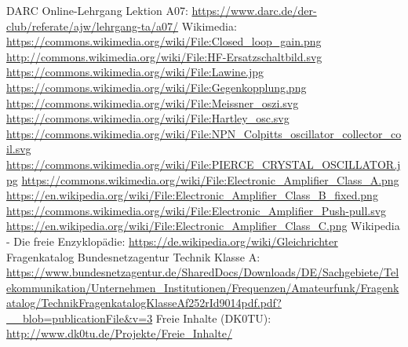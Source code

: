 \begin{thebibliography}{}
      DARC Online-Lehrgang Lektion A07:
                    \url{https://www.darc.de/der-club/referate/ajw/lehrgang-ta/a07/}
     	Wikimedia:
                    \url{https://commons.wikimedia.org/wiki/File:Closed_loop_gain.png}
                    \url{http://commons.wikimedia.org/wiki/File:HF-Ersatzschaltbild.svg}
                    \url{https://commons.wikimedia.org/wiki/File:Lawine.jpg}
                    \url{https://commons.wikimedia.org/wiki/File:Gegenkopplung.png}
                    \url{https://commons.wikimedia.org/wiki/File:Meissner_oszi.svg}
                    \url{https://commons.wikimedia.org/wiki/File:Hartley_osc.svg}
                    \url{https://commons.wikimedia.org/wiki/File:NPN_Colpitts_oscillator_collector_coil.svg}
                    \url{https://commons.wikimedia.org/wiki/File:PIERCE_CRYSTAL_OSCILLATOR.jpg}
                    \url{https://commons.wikimedia.org/wiki/File:Electronic_Amplifier_Class_A.png}
                    \url{https://en.wikipedia.org/wiki/File:Electronic_Amplifier_Class_B_fixed.png}
                    \url{https://commons.wikimedia.org/wiki/File:Electronic_Amplifier_Push-pull.svg}
                    \url{https://en.wikipedia.org/wiki/File:Electronic_Amplifier_Class_C.png}
                    \url{}
                    \url{}
                    \url{}
                    \url{}
        Wikipedia - Die freie Enzyklopädie:
                    \url{https://de.wikipedia.org/wiki/Gleichrichter}
	   Fragenkatalog Bundesnetzagentur Technik Klasse A:                   
                    \url{https://www.bundesnetzagentur.de/SharedDocs/Downloads/DE/Sachgebiete/Telekommunikation/Unternehmen_Institutionen/Frequenzen/Amateurfunk/Fragenkatalog/TechnikFragenkatalogKlasseAf252rId9014pdf.pdf?__blob=publicationFile&v=3}
        Freie Inhalte (DK0TU):
                    \url{http://www.dk0tu.de/Projekte/Freie_Inhalte/}
\end{thebibliography} 


